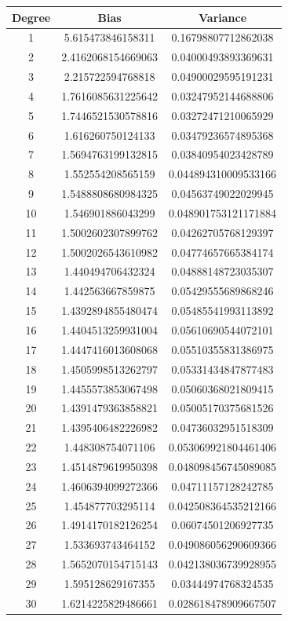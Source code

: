 \documentclass{article}
\begin{document}
\begin{center}
\begin{tabular}{ | c | c | c | }
\hline
Degree & Bias & Variance \\ 

\hline
1 & 5.615473846158311 & 0.16798807712862038 \\
\hline
2 & 2.4162068154669063 & 0.04000493893369631 \\
\hline
3 & 2.215722594768818 & 0.04900029595191231 \\
\hline
4 & 1.7616085631225642 & 0.03247952144688806 \\
\hline
5 & 1.7446521530578816 & 0.03272471210065929 \\
\hline
6 & 1.616260750124133 & 0.03479236574895368 \\
\hline
7 & 1.5694763199132815 & 0.03840954023428789 \\
\hline
8 & 1.552554208565159 & 0.044894310009533166 \\
\hline
9 & 1.5488808680984325 & 0.04563749022029945 \\
\hline
10 & 1.546901886043299 & 0.048901753121171884 \\
\hline
11 & 1.5002602307899762 & 0.04262705768129397 \\
\hline
12 & 1.5002026543610982 & 0.04774657665384174 \\
\hline
13 & 1.440494706432324 & 0.04888148723035307 \\
\hline
14 & 1.442563667859875 & 0.05429555689868246 \\
\hline
15 & 1.4392894855480474 & 0.05485541993113892 \\
\hline
16 & 1.4404513259931004 & 0.05610690544072101 \\
\hline
17 & 1.4447416013608068 & 0.05510355831386975 \\
\hline
18 & 1.4505998513262797 & 0.05331434847877483 \\
\hline
19 & 1.4455573853067498 & 0.05060368021809415 \\
\hline
20 & 1.4391479363858821 & 0.05005170375681526 \\
\hline
21 & 1.4395406482226982 & 0.04736032951518309 \\
\hline
22 & 1.448308754071106 & 0.053069921804461406 \\
\hline
23 & 1.4514879619950398 & 0.048098456745089085 \\
\hline
24 & 1.4606394099272366 & 0.04711157128242785 \\
\hline
25 & 1.454877703295114 & 0.042508364535212166 \\
\hline
26 & 1.4914170182126254 & 0.06074501206927735 \\
\hline
27 & 1.533693743464152 & 0.049086056290609366 \\
\hline
28 & 1.5652070154715143 & 0.042138036739928955 \\
\hline
29 & 1.595128629167355 & 0.03444974768324535 \\
\hline
30 & 1.6214225829486661 & 0.028618478909667507 \\
\hline
\end{tabular}
\end{center}
\end{document}
